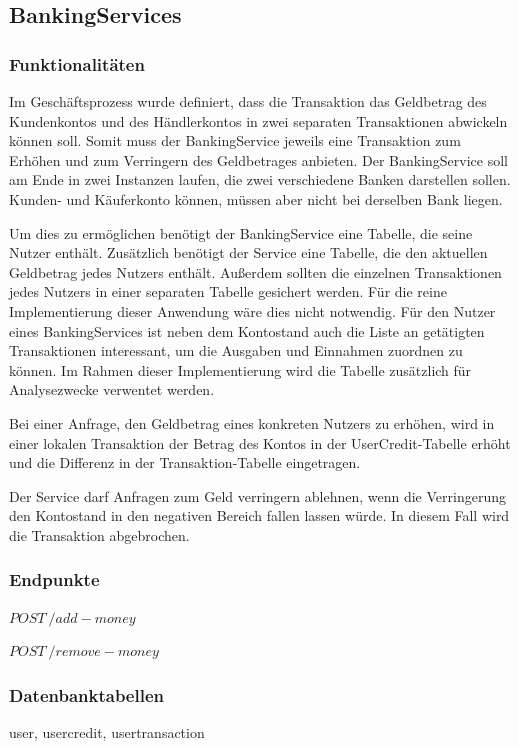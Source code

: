 \subsection{BankingServices}
\subsubsection{Funktionalitäten}
Im Geschäftsprozess wurde definiert, dass die Transaktion das Geldbetrag des Kundenkontos und des Händlerkontos in zwei separaten Transaktionen abwickeln können soll. Somit muss der BankingService jeweils eine Transaktion zum Erhöhen und zum Verringern des Geldbetrages anbieten. Der BankingService soll am Ende in zwei Instanzen laufen, die zwei verschiedene Banken darstellen sollen. Kunden- und Käuferkonto können, müssen aber nicht bei derselben Bank liegen. 

Um dies zu ermöglichen benötigt der BankingService eine Tabelle, die seine Nutzer enthält. Zusätzlich benötigt der Service eine Tabelle, die den aktuellen Geldbetrag jedes Nutzers enthält. Außerdem sollten die einzelnen Transaktionen jedes Nutzers in einer separaten Tabelle gesichert werden. Für die reine Implementierung dieser Anwendung wäre dies nicht notwendig. Für den Nutzer eines BankingServices ist neben dem Kontostand auch die Liste an getätigten Transaktionen interessant, um die Ausgaben und Einnahmen zuordnen zu können. Im Rahmen dieser Implementierung wird die Tabelle zusätzlich für Analysezwecke verwentet werden.
 
Bei einer Anfrage, den Geldbetrag eines konkreten Nutzers zu erhöhen, wird in einer lokalen Transaktion der Betrag des Kontos in der UserCredit-Tabelle erhöht und die Differenz in der Transaktion-Tabelle eingetragen. 

Der Service darf Anfragen zum Geld verringern ablehnen, wenn die Verringerung den Kontostand in den negativen Bereich fallen lassen würde. In diesem Fall wird die Transaktion abgebrochen. %
 
\subsubsection{Endpunkte}
$POST \ /add-money$

$POST \ /remove-money$

\subsubsection{Datenbanktabellen}
user, usercredit, usertransaction

